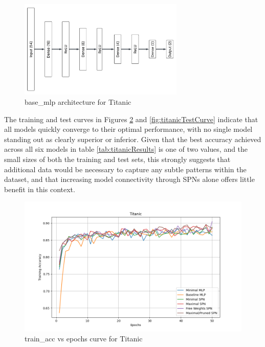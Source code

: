 \begin{figure}[H]
    \centering
    \includegraphics[height=0.28\textheight,width=0.7\textwidth]{Figures/Results/Titanic/titanic_base_mlp_architecture.png} 
    \captionsetup{justification=centering}  %
    \caption{base\_mlp architecture for Titanic}
    \label{fig:titanicMlpBaseArch}
\end{figure}

The training and test curves in Figures \ref{fig:titanicTrainCurve} and \ref{fig:titanicTestCurve} indicate that all models quickly converge to their optimal performance, with no single model standing out as clearly superior or inferior. Given that the best accuracy achieved across all six models in table \ref{tab:titanicResults} is one of two values, and the small sizes of both the training and test sets, this strongly suggests that additional data would be necessary to capture any subtle patterns within the dataset, and that increasing model connectivity through SPNs alone offers little benefit in this context.

\begin{figure}[H]
    \centering
    \includegraphics[width=\linewidth]{Figures/Results/Titanic/training_accuracy_plot.png} %
    \captionsetup{width=\linewidth}
    \caption{train\_acc vs epochs curve for Titanic}
    \label{fig:titanicTrainCurve}
\end{figure}


